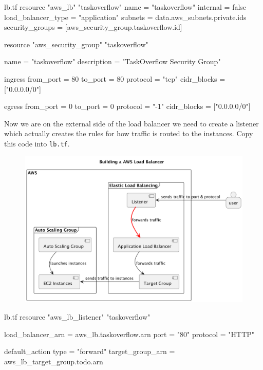 \documentclass{csse4400}
\begin{document}
\begin{code}[language=terraform,numbers=none]{lb.tf}
resource "aws_lb" "taskoverflow" {
  name               = "taskoverflow"
  internal           = false
  load_balancer_type = "application"
  subnets            = data.aws_subnets.private.ids
  security_groups    = [aws_security_group.taskoverflow.id]
}

resource "aws_security_group" "taskoverflow" {
  name = "taskoverflow"
  description = "TaskOverflow Security Group"

  ingress {
    from_port = 80
    to_port = 80
    protocol = "tcp"
    cidr_blocks = ["0.0.0.0/0"]
  }

  egress {
    from_port = 0
    to_port = 0
    protocol = "-1"
    cidr_blocks = ["0.0.0.0/0"]
  }
}
\end{code}

Now we are on the external side of the load balancer we need to create a listener which actually creates the rules for how traffic is routed to the instances. Copy this code into \texttt{lb.tf}.

\begin{figure}[H]
  \begin{center}
    \includegraphics[scale=0.2]{diagrams/lb4}
  \end{center}
\end{figure}

\begin{code}[language=terraform,numbers=none]{lb.tf}
resource "aws_lb_listener" "taskoverflow" {
  load_balancer_arn = aws_lb.taskoverflow.arn
  port              = "80"
  protocol          = "HTTP"

  default_action {
    type             = "forward"
    target_group_arn = aws_lb_target_group.todo.arn
  }
}
\end{code}
\end{document}
